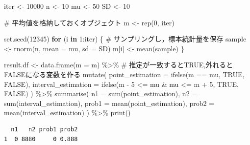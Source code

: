 \documentclass[
  a4paper,
]{ltjsbook}
\newenvironment{Shaded}{\begin{snugshade}}{\end{snugshade}}
\newcommand{\AttributeTok}[1]{\textcolor[rgb]{0.40,0.45,0.13}{#1}}
\newcommand{\CommentTok}[1]{\textcolor[rgb]{0.37,0.37,0.37}{#1}}
\newcommand{\ConstantTok}[1]{\textcolor[rgb]{0.56,0.35,0.01}{#1}}
\newcommand{\ControlFlowTok}[1]{\textcolor[rgb]{0.00,0.23,0.31}{\textbf{#1}}}
\newcommand{\DecValTok}[1]{\textcolor[rgb]{0.68,0.00,0.00}{#1}}
\newcommand{\FunctionTok}[1]{\textcolor[rgb]{0.28,0.35,0.67}{#1}}
\newcommand{\NormalTok}[1]{\textcolor[rgb]{0.00,0.23,0.31}{#1}}
\newcommand{\OtherTok}[1]{\textcolor[rgb]{0.00,0.23,0.31}{#1}}
\newcommand{\SpecialCharTok}[1]{\textcolor[rgb]{0.37,0.37,0.37}{#1}}
\begin{document}
\begin{Shaded}
\begin{Highlighting}[]
\NormalTok{iter }\OtherTok{\textless{}{-}} \DecValTok{10000}
\NormalTok{n }\OtherTok{\textless{}{-}} \DecValTok{10}
\NormalTok{mu }\OtherTok{\textless{}{-}} \DecValTok{50}
\NormalTok{SD }\OtherTok{\textless{}{-}} \DecValTok{10}

\CommentTok{\# 平均値を格納しておくオブジェクト}
\NormalTok{m }\OtherTok{\textless{}{-}} \FunctionTok{rep}\NormalTok{(}\DecValTok{0}\NormalTok{, iter)}

\FunctionTok{set.seed}\NormalTok{(}\DecValTok{12345}\NormalTok{)}
\ControlFlowTok{for}\NormalTok{ (i }\ControlFlowTok{in} \DecValTok{1}\SpecialCharTok{:}\NormalTok{iter) \{}
  \CommentTok{\# サンプリングし，標本統計量を保存}
\NormalTok{  sample }\OtherTok{\textless{}{-}} \FunctionTok{rnorm}\NormalTok{(n, }\AttributeTok{mean =}\NormalTok{ mu, }\AttributeTok{sd =}\NormalTok{ SD)}
\NormalTok{  m[i] }\OtherTok{\textless{}{-}} \FunctionTok{mean}\NormalTok{(sample)}
\NormalTok{\}}

\NormalTok{result.df }\OtherTok{\textless{}{-}} \FunctionTok{data.frame}\NormalTok{(}\AttributeTok{m =}\NormalTok{ m) }\SpecialCharTok{\%\textgreater{}\%}
  \CommentTok{\# 推定が一致するとTRUE,外れるとFALSEになる変数を作る}
  \FunctionTok{mutate}\NormalTok{(}
    \AttributeTok{point\_estimation =} \FunctionTok{ifelse}\NormalTok{(m }\SpecialCharTok{==}\NormalTok{ mu, }\ConstantTok{TRUE}\NormalTok{, }\ConstantTok{FALSE}\NormalTok{),}
    \AttributeTok{interval\_estimation =} \FunctionTok{ifelse}\NormalTok{(m }\SpecialCharTok{{-}} \DecValTok{5} \SpecialCharTok{\textless{}=}\NormalTok{ mu }\SpecialCharTok{\&}\NormalTok{ mu }\SpecialCharTok{\textless{}=}\NormalTok{ m }\SpecialCharTok{+} \DecValTok{5}\NormalTok{, }\ConstantTok{TRUE}\NormalTok{, }\ConstantTok{FALSE}\NormalTok{)}
\NormalTok{  ) }\SpecialCharTok{\%\textgreater{}\%}
  \FunctionTok{summarise}\NormalTok{(}
    \AttributeTok{n1 =} \FunctionTok{sum}\NormalTok{(point\_estimation),}
    \AttributeTok{n2 =} \FunctionTok{sum}\NormalTok{(interval\_estimation),}
    \AttributeTok{prob1 =} \FunctionTok{mean}\NormalTok{(point\_estimation),}
    \AttributeTok{prob2 =} \FunctionTok{mean}\NormalTok{(interval\_estimation)}
\NormalTok{  ) }\SpecialCharTok{\%\textgreater{}\%}
  \FunctionTok{print}\NormalTok{()}
\end{Highlighting}
\end{Shaded}

\begin{verbatim}
  n1   n2 prob1 prob2
1  0 8880     0 0.888
\end{verbatim}
\end{document}
